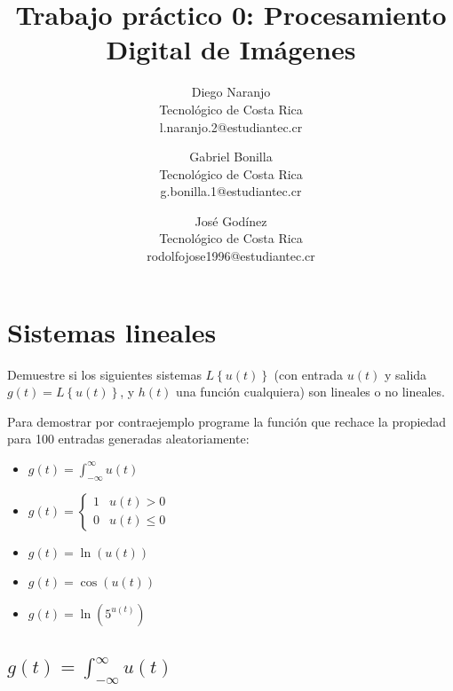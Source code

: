 \documentclass[12pt,a4paper]{article}
\begin{document}
\title{Trabajo práctico 0: Procesamiento Digital de Imágenes}

\author{
    Diego Naranjo \\ Tecnológico de Costa Rica \\ l.naranjo.2@estudiantec.cr
    \and Gabriel Bonilla \\ Tecnológico de Costa Rica \\ g.bonilla.1@estudiantec.cr
    \and José Godínez \\ Tecnológico de Costa Rica \\ rodolfojose1996@estudiantec.cr
}

\pagestyle{myheadings}


\maketitle


\section{Sistemas lineales}

Demuestre si los siguientes sistemas $L\left\{ u(t)\right\} $ (con entrada $u(t)$ y salida $g(t)=L\left\{ u(t)\right\} $, y $h(t)$ una función cualquiera) son lineales o no lineales.

Para demostrar por contraejemplo programe la función que rechace la propiedad para 100 entradas generadas aleatoriamente:

\begin{itemize}
    \item $g\left(t\right)=\int_{-\infty}^{\infty}u(t)$
    \item $g\left(t\right)=\begin{cases} 1 & u(t)>0\\ 0 & u(t)\leq0 \end{cases}\,$
    \item $g\left(t\right)=\ln\left(u(t)\right)$
    \item $g\left(t\right)=\cos\left(u(t)\right)$
    \item $g\left(t\right)=\ln\left(5^{u(t)}\right)$
\end{itemize}

\subsection{$g(t)=\int^{\infty}_{-\infty}u(t)$}
\end{document}
